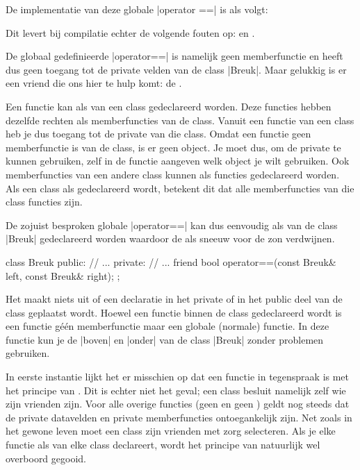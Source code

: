 \begin{cpplstShortInline}
De implementatie van deze globale |operator ==| is als volgt:

Dit levert bij compilatie echter de volgende fouten op:  en .

De globaal gedefinieerde |operator==| is namelijk geen memberfunctie en heeft dus geen toegang tot de private velden van de class |Breuk|. Maar gelukkig is er een vriend die ons hier te hulp komt: de \emph{}.

\label{sec:friend}
Een functie kan als  van een class gedeclareerd worden. 
Deze  functies hebben dezelfde rechten als memberfuncties van de class. 
Vanuit een  functie van een class heb je dus toegang tot de private  van die class. 
Omdat een  functie geen memberfunctie is van de class, is er geen  object. 
Je moet dus, om de private  te kunnen gebruiken, zelf in de  functie aangeven welk object je wilt gebruiken. 
Ook memberfuncties van een andere class kunnen als  functies gedeclareerd worden. 
Als een class als  gedeclareerd wordt, betekent dit dat alle 
memberfuncties van die class  functies zijn.

De zojuist besproken globale |operator==| kan dus eenvoudig als  van de class |Breuk| gedeclareerd worden waardoor de  als sneeuw voor de zon verdwijnen.
\begin{cpplstfragment}
class Breuk {
public:
	// ...
private:
	// ...
friend bool operator==(const Breuk& left, const Breuk& right);
};
\end{cpplstfragment}

Het maakt niets uit of een  declaratie in het private of in het public deel van de class geplaatst wordt. 
Hoewel een  functie binnen de class gedeclareerd wordt is een  functie géén memberfunctie maar een globale (normale) functie. 
In deze  functie kun je de  |boven| en |onder| van de class |Breuk| zonder problemen gebruiken.

In eerste instantie lijkt het er misschien op dat een  functie in tegenspraak is met het principe van . 
Dit is echter niet het geval; een class besluit namelijk zelf wie zijn vrienden zijn.
Voor alle overige functies (geen  en geen ) geldt nog steeds dat de private datavelden en private memberfuncties ontoegankelijk zijn. 
Net zoals in het gewone leven moet een class zijn vrienden met zorg selecteren. 
Als je elke functie als  van elke class declareert, wordt het principe van  natuurlijk wel overboord gegooid.


\end{cpplstShortInline}
